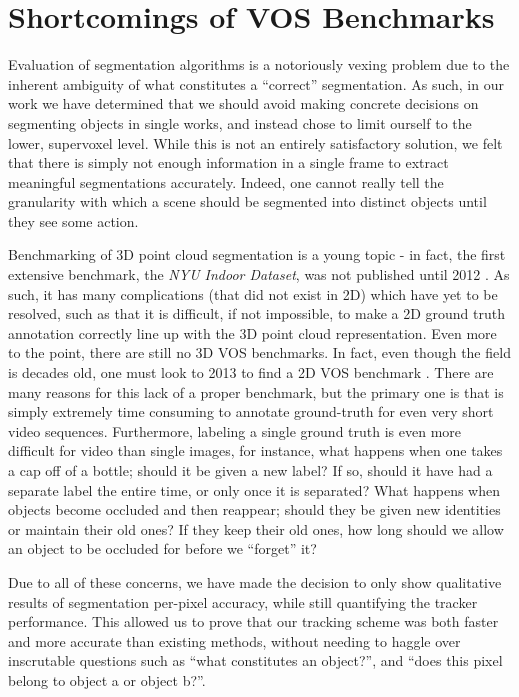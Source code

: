 \section{Shortcomings of VOS Benchmarks}
Evaluation of segmentation algorithms is a notoriously vexing problem due to the inherent ambiguity of what constitutes a ``correct'' segmentation. As such, in our work we have determined that we should avoid making concrete decisions on segmenting objects in single works, and instead chose to limit ourself to the lower, supervoxel level. While this is not an entirely satisfactory solution, we felt that there is simply not enough information in a single frame to extract meaningful segmentations accurately. Indeed, one cannot really tell the granularity with which a scene should be segmented into distinct objects until they see some action.

Benchmarking of 3D point cloud segmentation is a young topic - in fact, the first extensive benchmark, the \textit{NYU Indoor Dataset}, was not published until 2012 \cite{Silberman:ECCV12}. As such, it has many complications (that did not exist in 2D) which have yet to be resolved, such as that it is difficult, if not impossible, to make a 2D ground truth annotation correctly line up with the 3D point cloud representation. Even more to the point, there are still no 3D VOS benchmarks. In fact, even though the field is decades old, one must look to 2013 to find a 2D VOS benchmark \cite{Galasso2013}. There are many reasons for this lack of a proper benchmark, but the primary one is that is simply extremely time consuming to annotate ground-truth for even very short video sequences. Furthermore, labeling a single ground truth is even more difficult for video than single images, for instance, what happens when one takes a cap off of a bottle; should it be given a new label? If so, should it have had a separate label the entire time, or only once it is separated? What happens when objects become occluded and then reappear; should they be given new identities or maintain their old ones? If they keep their old ones, how long should we allow an object to be occluded for before we ``forget'' it?

Due to all of these concerns, we have made the decision to only show qualitative results of segmentation per-pixel accuracy, while still quantifying the tracker performance. This allowed us to prove that our tracking scheme was both faster and more accurate than existing methods, without needing to haggle over inscrutable questions such as ``what constitutes an object?'', and ``does this pixel belong to object a or object b?''.

